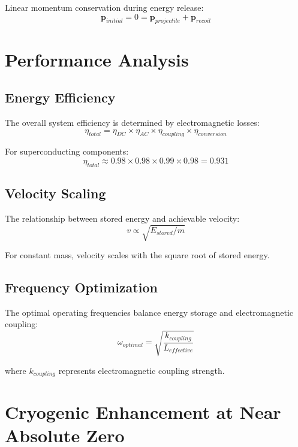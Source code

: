 \documentclass[12pt,a4paper]{article}
\begin{document}
Linear momentum conservation during energy release:
\begin{equation}
\mathbf{p}_{initial} = 0 = \mathbf{p}_{projectile} + \mathbf{p}_{recoil}
\end{equation}

\section{Performance Analysis}

\subsection{Energy Efficiency}

The overall system efficiency is determined by electromagnetic losses:
\begin{equation}
\eta_{total} = \eta_{DC} \times \eta_{AC} \times \eta_{coupling} \times \eta_{conversion}
\end{equation}

For superconducting components:
\begin{equation}
\eta_{total} \approx 0.98 \times 0.98 \times 0.99 \times 0.98 = 0.931
\end{equation}

\subsection{Velocity Scaling}

The relationship between stored energy and achievable velocity:
\begin{equation}
v \propto \sqrt{E_{stored}/m}
\end{equation}

For constant mass, velocity scales with the square root of stored energy.

\subsection{Frequency Optimization}

The optimal operating frequencies balance energy storage and electromagnetic coupling:
\begin{equation}
\omega_{optimal} = \sqrt{\frac{k_{coupling}}{L_{effective}}}
\end{equation}

where $k_{coupling}$ represents electromagnetic coupling strength.

\section{Cryogenic Enhancement at Near Absolute Zero}
\end{document}

